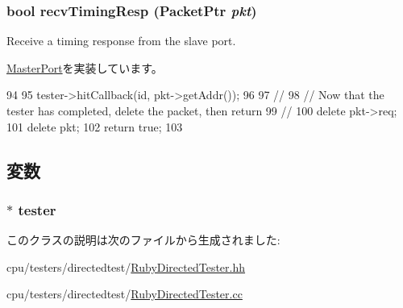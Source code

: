 \hypertarget{classRubyDirectedTester_1_1CpuPort_a482dba5588f4bee43e498875a61e5e0b}{
\subsubsection[{recvTimingResp}]{\setlength{\rightskip}{0pt plus 5cm}bool recvTimingResp ({\bf PacketPtr} {\em pkt})}}
\label{classRubyDirectedTester_1_1CpuPort_a482dba5588f4bee43e498875a61e5e0b}
Receive a timing response from the slave port. 

\hyperlink{classMasterPort_abd323548d6c93f8b0543f1fe3a86ca35}{MasterPort}を実装しています。


\begin{DoxyCode}
94 {
95     tester->hitCallback(id, pkt->getAddr());
96     
97     //
98     // Now that the tester has completed, delete the packet, then return
99     //
100     delete pkt->req;
101     delete pkt;
102     return true;
103 }
\end{DoxyCode}


\subsection{変数}
\hypertarget{classRubyDirectedTester_1_1CpuPort_acb5296901e83f3dd66a2fdaab4fbc259}{
\subsubsection[{tester}]{$\ast$ {\bf tester}}}
\label{classRubyDirectedTester_1_1CpuPort_acb5296901e83f3dd66a2fdaab4fbc259}


このクラスの説明は次のファイルから生成されました:\begin{DoxyCompactItemize}
\item 
cpu/testers/directedtest/\hyperlink{RubyDirectedTester_8hh}{RubyDirectedTester.hh}\item 
cpu/testers/directedtest/\hyperlink{RubyDirectedTester_8cc}{RubyDirectedTester.cc}\end{DoxyCompactItemize}

